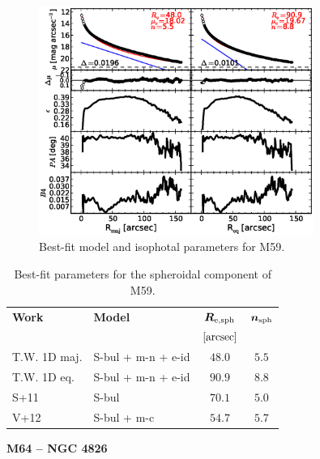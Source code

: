 \documentclass[preprint2]{emulateapj}
\newcommand{\fitfigurewidth}{0.8\textwidth}
\begin{document}
  \begin{figure}[h]
  \begin{center}
  \includegraphics[width=\fitfigurewidth]{images/m59_1Dfit.eps}
  \caption{Best-fit model and isophotal parameters for M59.}
  \end{center}
  \end{figure}

  \begin{table}[h]
  \small
  \caption{Best-fit parameters for the spheroidal component of M59.}
  \begin{center}
  \begin{tabular}{llcc}
  \hline
  {\bf Work} & {\bf Model}   & $\bm R_{\rm e,sph}$    & $\bm n_{\rm sph}$ \\
    &  &  $[\rm arcsec]$ & \\
  \hline
  T.W. 1D maj. & S-bul + m-n + e-id & $48.0$  &  $5.5$ \\
  T.W. 1D eq.  & S-bul + m-n + e-id & $90.9$  &  $8.8$ \\
  \hline 
  S+11         & S-bul       & $70.1$  &  $5.0$ \\
  V+12         & S-bul + m-c & $54.7$  &  $5.7$ \\
  \hline
  \end{tabular}
  \end{center}
  \label{tab:m59}
  \end{table}

  \clearpage\newpage\noindent
  {\bf M64 -- NGC 4826 \\}
\end{document}
